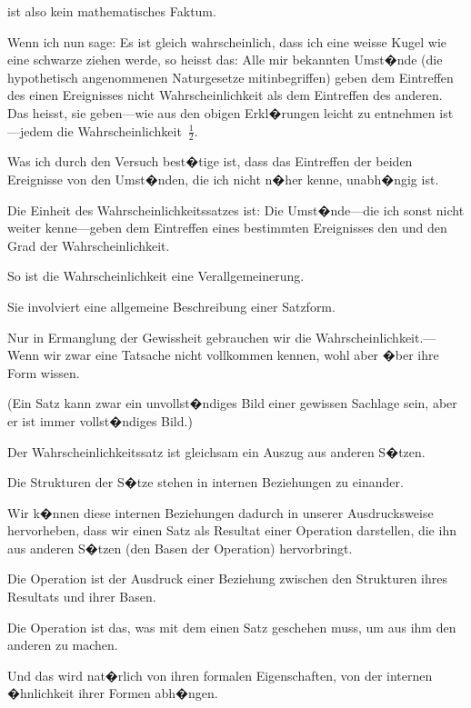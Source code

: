 \begin{propositions}
{ ist also kein mathematisches Faktum.

Wenn ich nun sage: Es ist gleich wahrscheinlich,
dass ich eine weisse Kugel wie eine
schwarze ziehen werde, so heisst das: Alle mir
bekannten Umst�nde (die hypothetisch angenommenen
Naturgesetze mitinbegriffen) geben dem
Eintreffen des einen Ereignisses nicht 
Wahrscheinlichkeit als dem Eintreffen des anderen.
Das heisst, sie geben---wie aus den obigen Erkl�rungen
leicht zu entnehmen ist---jedem die
Wahrscheinlichkeit~$\frac{1}{2}$.

Was ich durch den Versuch best�tige ist, dass
das Eintreffen der beiden Ereignisse von den Umst�nden,
die ich nicht n�her kenne, unabh�ngig ist.}


{Die Einheit des Wahrscheinlichkeitssatzes ist:
Die Umst�nde---die ich sonst nicht weiter kenne---geben
dem Eintreffen eines bestimmten Ereignisses
den und den Grad der Wahrscheinlichkeit.}


{So ist die Wahrscheinlichkeit eine Verallgemeinerung.

Sie involviert eine allgemeine Beschreibung
einer Satzform.

Nur in Ermanglung der Gewissheit gebrauchen
wir die Wahr\-schein\-lich\-keit.---Wenn wir zwar eine
Tatsache nicht vollkommen kennen, wohl aber
 �ber ihre Form wissen.

(Ein Satz kann zwar ein unvollst�ndiges Bild
einer gewissen Sachlage sein, aber er ist immer
 vollst�ndiges Bild.)

Der Wahrscheinlichkeitssatz ist gleichsam ein
Auszug aus anderen S�tzen.}


{Die Strukturen der S�tze stehen in internen
Beziehungen zu einander.}


{Wir k�nnen diese internen Beziehungen
dadurch in unserer Ausdrucksweise hervorheben,
dass wir einen Satz als Resultat einer Operation
darstellen, die ihn aus anderen S�tzen (den Basen
der Operation) hervorbringt.}


{Die Operation ist der Ausdruck einer Beziehung
zwischen den Strukturen ihres Resultats und ihrer
Basen.}


{Die Operation ist das, was mit dem einen Satz
geschehen muss, um aus ihm den anderen zu machen.}


{Und das wird nat�rlich von ihren formalen
Eigenschaften, von der internen �hnlichkeit ihrer
Formen abh�ngen.}



\end{propositions}
